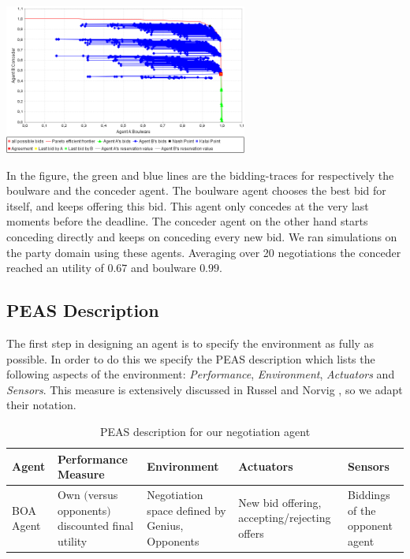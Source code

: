 \documentclass[a4paper,10pt]{article}
\begin{document}
\begin{center}
 \includegraphics[width=0.6\textwidth]{traceConcederBoulware.png}
\end{center}
In the figure, the green and blue lines are the bidding-traces for respectively the boulware and the conceder agent. The boulware agent chooses the best bid for itself, and keeps offering this bid. This agent
only concedes at the very last moments before the deadline. The conceder agent on the other hand
starts conceding directly and keeps on conceding every new bid. We ran simulations on the party domain using these agents. Averaging over 20 negotiations the conceder reached an utility of $0.67$ and
boulware $0.99$. 
 
\subsection{PEAS Description}

The first step in designing an agent is to specify the environment as fully as possible. In order to do this we specify the PEAS description which lists the following aspects of the environment: \emph{Performance}, \emph{Environment}, \emph{Actuators} and \emph{Sensors}. This measure is extensively discussed in Russel and Norvig \cite{russel-norvig}, so we adapt their notation.

\begin{table}[H]
    \begin{tabular}{|p{1.8cm}|p{3cm}|p{3cm}|p{3cm}|p{3cm}|}
    \hline
    \textbf{Agent} & \textbf{Performance \mbox{Measure}} & \textbf{Environment} & \textbf{Actuators} & \textbf{Sensors} \\
    \hline
    BOA Agent & Own $($versus opponents$)$ discounted final utility & Negotiation space defined by Genius, \mbox{Opponents} & New bid offering, \mbox{accepting/rejecting} offers & Biddings of the \mbox{opponent} agent \\
    \hline
    \end{tabular}
    
    \caption{PEAS description for our negotiation agent \label{table:peas-description}}
\end{table}
\end{document}
